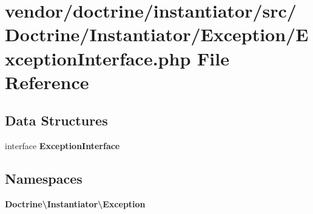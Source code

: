 \section{vendor/doctrine/instantiator/src/\+Doctrine/\+Instantiator/\+Exception/\+Exception\+Interface.php File Reference}
\label{doctrine_2instantiator_2src_2_doctrine_2_instantiator_2_exception_2_exception_interface_8php}
\subsection*{Data Structures}
\begin{DoxyCompactItemize}
\item 
interface {\bf Exception\+Interface}
\end{DoxyCompactItemize}
\subsection*{Namespaces}
\begin{DoxyCompactItemize}
\item 
 {\bf Doctrine\textbackslash{}\+Instantiator\textbackslash{}\+Exception}
\end{DoxyCompactItemize}

